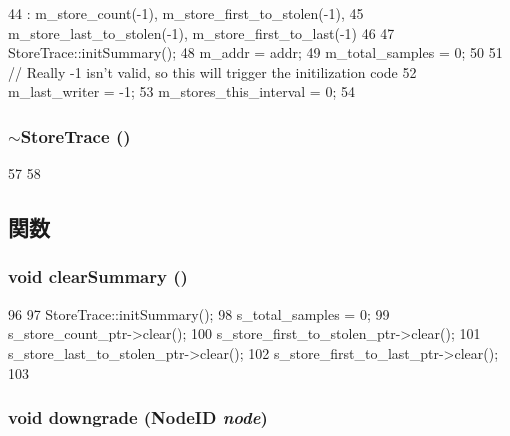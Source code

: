\begin{DoxyCode}
44     : m_store_count(-1), m_store_first_to_stolen(-1),
45       m_store_last_to_stolen(-1), m_store_first_to_last(-1)
46 {
47     StoreTrace::initSummary();
48     m_addr = addr;
49     m_total_samples = 0;
50 
51     // Really -1 isn't valid, so this will trigger the initilization code
52     m_last_writer = -1;
53     m_stores_this_interval = 0;
54 }
\end{DoxyCode}
\hypertarget{classStoreTrace_a63446b476732ad8bf7be15edff60afa5}{
\subsubsection[{$\sim$StoreTrace}]{\setlength{\rightskip}{0pt plus 5cm}$\sim${\bf StoreTrace} ()}}
\label{classStoreTrace_a63446b476732ad8bf7be15edff60afa5}



\begin{DoxyCode}
57 {
58 }
\end{DoxyCode}


\subsection{関数}
\hypertarget{classStoreTrace_a4fd1fa85dd3dbc5d630f99232dde1b3d}{
\subsubsection[{clearSummary}]{\setlength{\rightskip}{0pt plus 5cm}void clearSummary ()}}
\label{classStoreTrace_a4fd1fa85dd3dbc5d630f99232dde1b3d}



\begin{DoxyCode}
96 {
97     StoreTrace::initSummary();
98     s_total_samples = 0;
99     s_store_count_ptr->clear();
100     s_store_first_to_stolen_ptr->clear();
101     s_store_last_to_stolen_ptr->clear();
102     s_store_first_to_last_ptr->clear();
103 }
\end{DoxyCode}
\hypertarget{classStoreTrace_a4c38a560d4a5bbdfadc6d76975484b26}{
\subsubsection[{downgrade}]{\setlength{\rightskip}{0pt plus 5cm}void downgrade ({\bf NodeID} {\em node})}}
\label{classStoreTrace_a4c38a560d4a5bbdfadc6d76975484b26}



